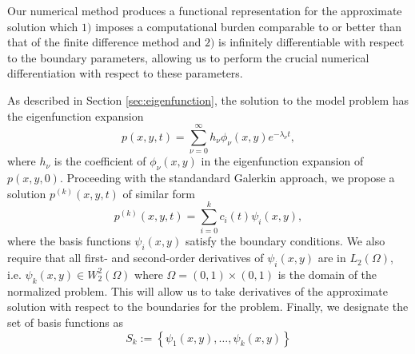 \documentclass[10pt]{article}
\begin{document}
Our numerical method produces a functional representation for the
approximate solution which $1)$ imposes a computational burden
comparable to or better than that of the finite difference method and
$2)$ is infinitely differentiable with respect to the boundary
parameters, allowing us to perform the crucial numerical
differentiation with respect to these parameters.

As described in Section \ref{sec:eigenfunction}, the solution to the
model problem has the eigenfunction expansion 
\[
  p(x,y,t) = \sum_{\nu=0}^\infty h_\nu \phi_\nu(x,y) e^{-\lambda_\nu t},
\]
where $h_\nu$ is the coefficient of $\phi_\nu(x,y)$ in the
eigenfunction expansion of $p(x,y,0)$. Proceeding with the standandard
Galerkin approach, we propose a solution $p^{(k)}(x,y,t)$ of similar
form
\[
  p^{(k)}(x,y,t) = \sum_{i=0}^k c_i(t) \psi_i(x,y),
\]
where the basis functions $\psi_i(x,y)$ satisfy the boundary
conditions. We also require that all first- and second-order
derivatives of $\psi_i(x,y)$ are in $L_2(\Omega)$, i.e.
$\psi_k(x,y) \in W_{2}^{2}(\Omega)$ where
$\Omega = (0,1) \times (0,1)$ is the domain of the normalized
problem. This will allow us to take derivatives of the approximate
solution with respect to the boundaries for the problem. Finally, we
designate the set of basis functions as
\[
  S_k := \left\{ \psi_1(x,y), \ldots, \psi_k(x,y) \right\}
\]
\end{document}
